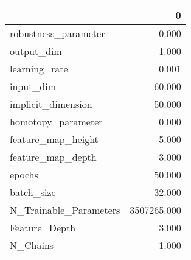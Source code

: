 \begin{tabular}{lr}
\toprule
{} &            0 \\
\midrule
robustness\_parameter   &        0.000 \\
output\_dim             &        1.000 \\
learning\_rate          &        0.001 \\
input\_dim              &       60.000 \\
implicit\_dimension     &       50.000 \\
homotopy\_parameter     &        0.000 \\
feature\_map\_height     &        5.000 \\
feature\_map\_depth      &        3.000 \\
epochs                 &       50.000 \\
batch\_size             &       32.000 \\
N\_Trainable\_Parameters &  3507265.000 \\
Feature\_Depth          &        3.000 \\
N\_Chains               &        1.000 \\
\bottomrule
\end{tabular}

